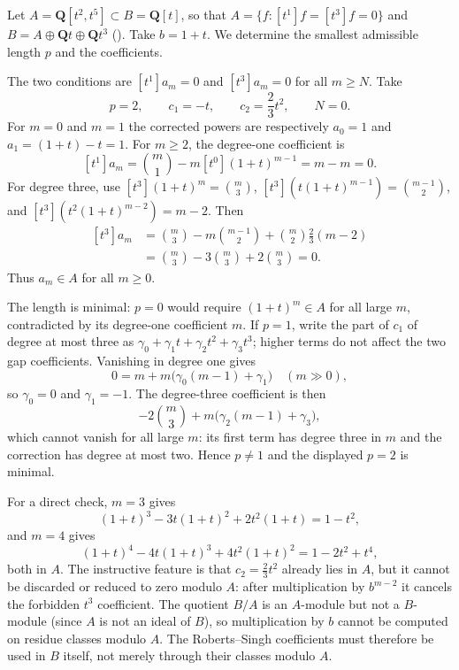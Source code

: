 \begin{example}[Two gaps: $p=2$, and an $A$-valued correction still matters]
\label{ex:ch44-two-gaps}
Let $A=\mathbf Q[t^2,t^5]\subset B=\mathbf Q[t]$, so that
$A=\{f:[t^1]f=[t^3]f=0\}$ and $B=A\oplus\mathbf Qt\oplus\mathbf Qt^3$
().  Take $b=1+t$.  We determine the
smallest admissible length $p$ and the coefficients.

The two conditions are $[t^1]a_m=0$ and $[t^3]a_m=0$ for all
$m\ge N$.  Take
\[
 p=2,
 \qquad
 c_1=-t,
 \qquad
 c_2=\frac23t^2,
 \qquad
 N=0 .
\]
For $m=0$ and $m=1$ the corrected powers are respectively $a_0=1$ and
$a_1=(1+t)-t=1$.  For $m\ge2$, the degree-one coefficient is
\[
 [t^1]a_m=\binom m1-m[t^0](1+t)^{m-1}=m-m=0.
\]
For degree three, use
$[t^3](1+t)^m=\binom m3$,
$[t^3](t(1+t)^{m-1})=\binom{m-1}2$, and
$[t^3](t^2(1+t)^{m-2})=m-2$.  Then
\[
 \begin{aligned}
 [t^3]a_m
 &=\binom m3-m\binom{m-1}2
   +\binom m2\frac23(m-2)\\
 &=\binom m3-3\binom m3+2\binom m3=0.
 \end{aligned}
\]
Thus $a_m\in A$ for all $m\ge0$.

The length is minimal: $p=0$ would require $(1+t)^m\in A$ for all
large $m$, contradicted by its degree-one coefficient $m$.  If $p=1$, write the part of $c_1$ of
degree at most three as
$\gamma_0+\gamma_1t+\gamma_2t^2+\gamma_3t^3$; higher terms do not affect
the two gap coefficients.  Vanishing in degree one gives
\[
 0=m+m\bigl(\gamma_0(m-1)+\gamma_1\bigr)
 \quad(m\gg0),
\]
so $\gamma_0=0$ and $\gamma_1=-1$.  The degree-three coefficient is then
\[
 -2\binom m3+m\bigl(\gamma_2(m-1)+\gamma_3\bigr),
\]
which cannot vanish for all large $m$: its first term has degree three in
$m$ and the correction has degree at most two.  Hence $p\ne1$ and the
displayed $p=2$ is minimal.

For a direct check, $m=3$ gives
\[
 (1+t)^3-3t(1+t)^2+2t^2(1+t)=1-t^2,
\]
and $m=4$ gives
\[
 (1+t)^4-4t(1+t)^3+4t^2(1+t)^2=1-2t^2+t^4,
\]
both in $A$.  The instructive feature is that
$c_2=\frac23t^2$ already lies in $A$, but it cannot be discarded or
reduced to zero modulo $A$: after multiplication by $b^{m-2}$ it cancels
the forbidden $t^3$ coefficient.  The quotient $B/A$ is an $A$-module
but not a $B$-module (since $A$ is not an ideal of $B$), so multiplication
by $b$ cannot be computed on residue classes modulo $A$.  The
Roberts--Singh coefficients must therefore be used in $B$ itself, not
merely through their classes modulo $A$.
\end{example}

